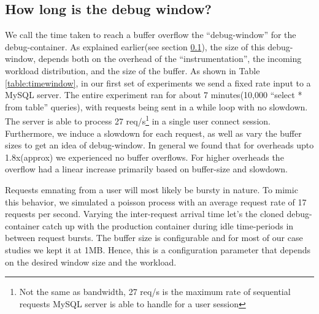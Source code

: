 	


\subsection{How long is the debug window?}
\label{sec:timewindowPerformance}

\noindent
We call the time taken to reach a buffer overflow the ``debug-window'' for the debug-container.
As explained earlier(see section \ref{sec:timewindowPerformance}), the size of this debug-window, depends both on the overhead of the ``instrumentation'', the incoming workload distribution, and the size of the buffer.
As shown in Table \ref{table:timewindow}, in our first set of experiments we send a fixed rate input to a MySQL server.
The entire experiment ran for about 7 minutes(10,000 ``select * from table'' queries), with requests being sent in a while loop with no slowdown.
The server is able to process 27 req/s\footnote{Not the same as bandwidth, 27 req/s is the maximum rate of sequential requests MySQL server is able to handle for a user session} in a single user connect session. 
Furthermore, we induce a slowdown for each request, as well as vary the buffer sizes to get an idea of debug-window. 
In general we found that for overheads upto 1.8x(approx) we experienced no buffer overflows.
For higher overheads the overflow had a linear increase primarily based on buffer-size and slowdown.

Requests emnating from a user will most likely be bursty in nature.
To mimic this behavior, we simulated a poisson process with an average request rate of 17 requests per second. 
Varying the inter-request arrival time let's the cloned debug-container catch up with the production container during idle time-periods in between request bursts.
The buffer size is configurable and for most of our case studies we kept it at 1MB.
Hence, this is a configuration parameter that depends on the desired window size and the workload.

